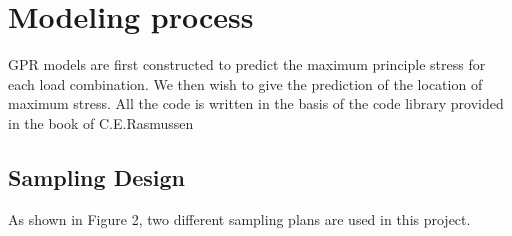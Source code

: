 \documentclass[conference]{IEEEtran}
\begin{document}




 
\section{Modeling process}
GPR models are first constructed to predict the maximum principle stress for each load combination. We then wish to give the prediction of the location of maximum stress. All the code is written in the basis of the code library provided in the book\cite{rasmussen2004gaussian} of C.E.Rasmussen
\subsection{Sampling Design}
As shown in Figure 2, two different sampling plans are used in this project.
\end{document}
